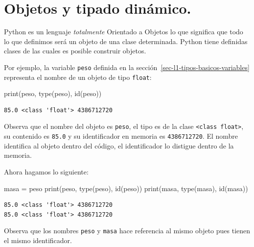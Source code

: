 \documentclass[
  spanish,
  letterpaper,
]{scrbook}
\newenvironment{Shaded}{\begin{snugshade}}{\end{snugshade}}
\newcommand{\BuiltInTok}[1]{\textcolor[rgb]{0.00,0.23,0.31}{#1}}
\newcommand{\NormalTok}[1]{\textcolor[rgb]{0.00,0.23,0.31}{#1}}
\newcommand{\OperatorTok}[1]{\textcolor[rgb]{0.37,0.37,0.37}{#1}}
\theoremstyle{definition}
\theoremstyle{remark}
\begin{document}
\section{Objetos y tipado
dinámico.}\label{sec-l1-objetos-tipado-dinamico}

Python es un lenguaje \emph{totalmente} Orientado a Objetos lo que
significa que todo lo que definimos será un objeto de una clase
determinada. Python tiene definidas clases de las cuales es posible
construir objetos.

Por ejemplo, la variable \texttt{peso} definida en la
sección~\ref{sec-l1-tipos-basicos-variables} representa el nombre de un
objeto de tipo \texttt{float}:

\begin{Shaded}
\begin{Highlighting}[]
\BuiltInTok{print}\NormalTok{(peso, }\BuiltInTok{type}\NormalTok{(peso), }\BuiltInTok{id}\NormalTok{(peso))}
\end{Highlighting}
\end{Shaded}

\begin{verbatim}
85.0 <class 'float'> 4386712720
\end{verbatim}

Observa que el nombre del objeto es \texttt{peso}, el tipo es de la
clase
\texttt{\textless{}class\ \textquotesingle{}float\textquotesingle{}\textgreater{}},
su contenido es \texttt{85.0} y su identificador en memoria es
\texttt{4386712720}. El nombre identifica al objeto dentro del código,
el identificador lo distigue dentro de la memoria.

Ahora hagamos lo siguiente:

\begin{Shaded}
\begin{Highlighting}[]
\NormalTok{masa }\OperatorTok{=}\NormalTok{ peso}
\BuiltInTok{print}\NormalTok{(peso, }\BuiltInTok{type}\NormalTok{(peso), }\BuiltInTok{id}\NormalTok{(peso))}
\BuiltInTok{print}\NormalTok{(masa, }\BuiltInTok{type}\NormalTok{(masa), }\BuiltInTok{id}\NormalTok{(masa))}
\end{Highlighting}
\end{Shaded}

\begin{verbatim}
85.0 <class 'float'> 4386712720
85.0 <class 'float'> 4386712720
\end{verbatim}

Observa que los nombres \texttt{peso} y \texttt{masa} hace referencia al
mismo objeto pues tienen el mismo identificador.
\end{document}
